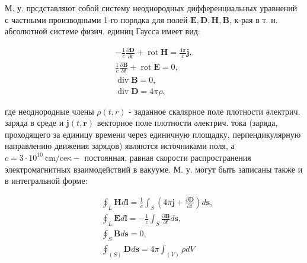\documentclass[10pt]{article}
\begin{document}
М. у. прсдставляют собой систему неоднородных дифференциальных уравнений с частными производными 1-го порядка для полей $\boldsymbol{E}, \boldsymbol{D}, \boldsymbol{H}, \boldsymbol{B}$, к-рая в т. н. абсолютной системе физич. единиц Гаусса имеет вид:



\[

\begin{gathered}

-\frac{1}{c} \frac{\partial \boldsymbol{D}}{\partial t}+\operatorname{rot} \boldsymbol{H}=\frac{4 \pi}{c} \boldsymbol{j}, \\

\frac{1}{c} \frac{\partial \boldsymbol{B}}{\partial t}+\operatorname{rot} \boldsymbol{E}=0, \\

\operatorname{div} \boldsymbol{B}=0, \\

\operatorname{div} \boldsymbol{D}=4 \pi \rho,

\end{gathered}

\]



где неоднородные члены $\rho(t, r)$ - заданное скалярное поле плотности әлектрич. заряда в среде и $\boldsymbol{j}(t, \boldsymbol{r})$ векторное поле плотности әлектрич. тока (заряда, проходящего за единицу времени через единичную площадку, перпендикулярную направлению движения зарядов) являются источниками поля, а $c=3 \cdot 10^{10} \mathrm{~cm} / \mathrm{ce \kappa}-$ постоянная, равная скорости распространения электромагнитных взаимодействий в вакууме. М. у. могут быть записаны также и в интегральной форме:



\[

\begin{aligned}

& \oint_{L} \boldsymbol{H} d \boldsymbol{l}=\frac{1}{c} \int_{S}\left(4 \pi \boldsymbol{j}+\frac{\partial \boldsymbol{D}}{\partial t}\right) d \boldsymbol{s}, \\

& \oint_{L} \boldsymbol{E} d \boldsymbol{l}=-\frac{1}{c} \int_{S} \frac{\partial \boldsymbol{B}}{\partial t} d \boldsymbol{s}, \\

& \oint_{S} \boldsymbol{B} d \boldsymbol{s}=0, \\

& \oint_{(S)} \boldsymbol{D} d \boldsymbol{s}=4 \pi \int_{(V)} \rho d V

\end{aligned}

\]
\end{document}
